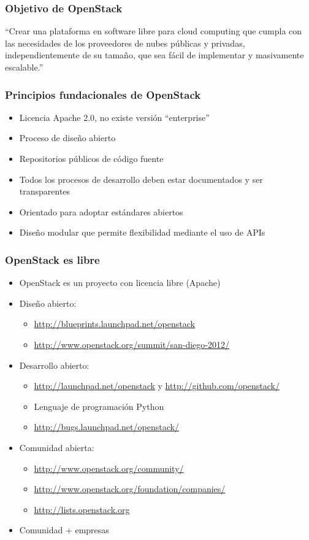 \documentclass{beamer}
\begin{document}
\begin{frame}
  \frametitle{Objetivo de OpenStack}
  \begin{center}
    ``Crear una plataforma en software libre para cloud computing que cumpla con
    las necesidades de los proveedores de nubes públicas y privadas,
    independientemente de su tamaño, que sea fácil de implementar y masivamente
    escalable.''
  \end{center}
\end{frame}

\begin{frame}
  \frametitle{Principios fundacionales de OpenStack}
  \begin{itemize}
  \item Licencia Apache 2.0, no existe versión ``enterprise''
  \item Proceso de diseño abierto
  \item Repositorios públicos de código fuente
  \item Todos los procesos de desarrollo deben estar documentados y ser
    transparentes
  \item Orientado para adoptar estándares abiertos
  \item Diseño modular que permite flexibilidad mediante el uso de APIs
  \end{itemize}
\end{frame}
\begin{frame}[fragile]
  \frametitle{OpenStack es libre}
  \begin{itemize}
  \item OpenStack es un proyecto con licencia libre (Apache)
  \item Diseño abierto:
    \begin{itemize}
    \item \url{http://blueprints.launchpad.net/openstack}
    \item \url{http://www.openstack.org/summit/san-diego-2012/}
    \end{itemize}
  \item Desarrollo abierto:
    \begin{itemize}
    \item \url{http://launchpad.net/openstack} y \url{http://github.com/openstack/}
    \item Lenguaje de programación Python
    \item \url{http://bugs.launchpad.net/openstack/}
    \end{itemize}
    \item Comunidad abierta:
      \begin{itemize}
      \item \url{http://www.openstack.org/community/}
      \item \url{http://www.openstack.org/foundation/companies/}
      \item \url{http://lists.openstack.org}
      \end{itemize}
    \item Comunidad + empresas
  \end{itemize}
\end{frame}
\end{document}
